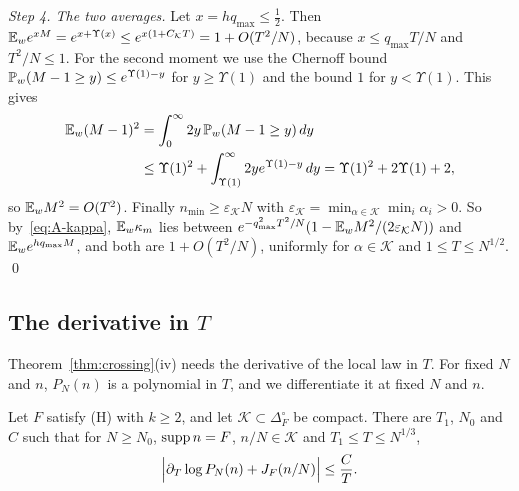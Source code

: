\emph{Step 4. The two averages.} Let $x=hq_{\max}\le\frac12$. Then
$\mathbb{E}_we^{xM}=e^{x+\Upsilon(x)}\le e^{x(1+C_{\mathcal K}T)}=1+O(T^2/N)$, because
$x\le q_{\max}T/N$ and $T^2/N\le1$. For the second moment we use the Chernoff
bound $\mathbb{P}_w(M-1\ge y)\le e^{\Upsilon(1)-y}$ for $y\ge\Upsilon(1)$ and the bound $1$
for $y<\Upsilon(1)$. This gives
\begin{align*}
\mathbb{E}_w(M-1)^2&=\int_0^\infty2y\,\mathbb{P}_w(M-1\ge y)\,dy\\
&\le\Upsilon(1)^2+\int_{\Upsilon(1)}^\infty2ye^{\Upsilon(1)-y}\,dy
=\Upsilon(1)^2+2\Upsilon(1)+2,
\end{align*}
so $\mathbb{E}_wM^2=O(T^2)$. Finally $n_{\min}\ge\varepsilon_{\mathcal K}N$ with
$\varepsilon_{\mathcal K}=\min_{\alpha\in\mathcal K}\min_i\alpha_i>0$. So
by~\eqref{eq:A-kappa}, $\mathbb{E}_w\kappa_m$ lies between
$e^{-q_{\max}^2T^2/N}(1-\mathbb{E}_wM^2/(2\varepsilon_{\mathcal K}N))$ and
$\mathbb{E}_we^{hq_{\max}M}$, and both are $1+O(T^2/N)$, uniformly for
$\alpha\in\mathcal K$ and $1\le T\le N^{1/2}$. \qed

\subsection{The derivative in \texorpdfstring{$T$}{T}}

Theorem~\ref{thm:crossing}(iv) needs the derivative of the local law in $T$. For fixed $N$ and
$n$, $P_N(n)$ is a polynomial in $T$, and we differentiate it at fixed $N$ and $n$.

\begin{lemma}\label{lem:derivative}
Let $F$ satisfy \textup{(H)} with $k\ge2$, and let $\mathcal K\subset\Delta_F^\circ$ be compact.
There are $T_1$, $N_0$ and $C$ such that for $N\ge N_0$, $\operatorname{supp} n=F$, $n/N\in\mathcal K$ and
$T_1\le T\le N^{1/3}$,
\[
\Bigl|\partial_T\log P_N(n)+J_F(n/N)\Bigr|\le\frac CT .
\]
\end{lemma}

